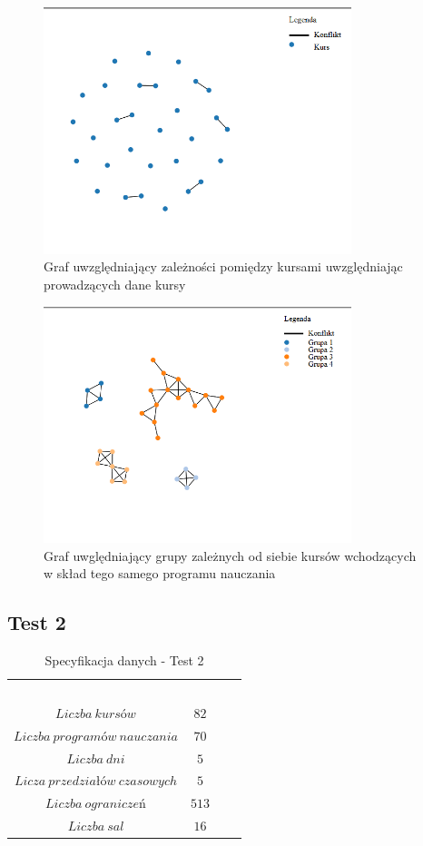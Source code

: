 \begin{figure}[h!]
  \caption{Graf uwzględniający zależności pomiędzy kursami uwzględniając prowadzących dane kursy}
  \centering
    \includegraphics[width=0.8\textwidth]{test1_teach.PNG}
\end{figure}
\begin{figure}[h!]
  \caption{Graf uwględniający grupy zależnych od siebie kursów wchodzących w skład tego samego programu nauczania}
  \centering
    \includegraphics[width=0.8\textwidth]{test1_con.PNG}
\end{figure}
\subsection{Test 2}
\begin{table}[H]
\begin{center}

\begin{tabular}{ |c|c|c|c| }
\multicolumn{1}{r}{}
 &  \multicolumn{1}{c}{$$}
 & \multicolumn{1}{c}{$$} 
 \\
\cline{1-2}
$Liczba\ kursów$ & $82$\\
\cline{1-2}
$Liczba\ programów\ nauczania$ & $70$\\
\cline{1-2}
$Liczba\ dni$ & $5$ \\
\cline{1-2}
$Licza\ przedziałów\ czasowych$ & $5$ \\
\cline{1-2}
$Liczba\ ograniczeń$ & $513$ \\
\cline{1-2}
$Liczba\ sal$ & $16$ \\
\cline{1-2}
\end{tabular}
\end{center}
\caption {Specyfikacja danych - Test 2}
\end{table}
